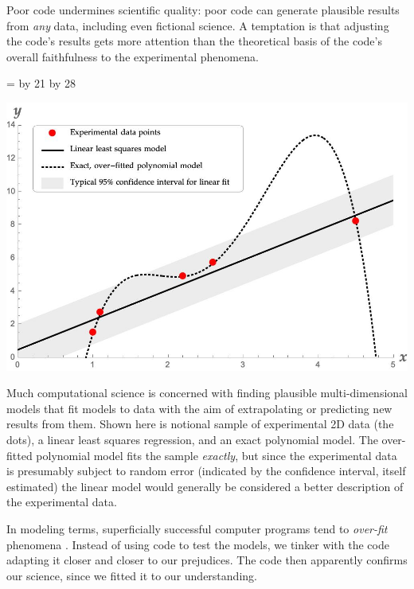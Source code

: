 \documentclass[11pt]{article}
\begin{document}
\noindent
Poor code undermines scientific quality: poor code can generate plausible results from \emph{any\/} data, including even fictional science. A temptation is that %
adjusting the code's results gets more attention than the theoretical basis of the code's overall faithfulness to the experimental phenomena. %
\def\imageWidthCalculation{\multiply \imageWidth by 21 \divide \imageWidth by 28}
\def\figureStarDetails{*}
\def\imageWidthCalculation{\multiply \imageWidth by 21 \divide \imageWidth by 28}
\def\figureStarDetails{*}
\begin{figure\figureStarDetails}[t]
{ \newdimen \imageWidth 
  \imageWidth=\textwidth
  \imageWidthCalculation
  \begin{center}\includegraphics[width=\imageWidth]{generated/mathematicaplot.jpg}\end{center}}
\caption{Much computational science is concerned with finding plausible multi-dimensional models that fit models to data with the aim of extrapolating or predicting new results from them. Shown here is notional sample of experimental 2D data (the dots), a linear least squares regression, and an exact polynomial model. The over-fitted polynomial model fits the sample \emph{exactly\/}, but since the experimental data is presumably subject to random error (indicated by the confidence interval, itself estimated) the linear model would generally be considered a better description of the experimental data.}
\label{fig-overfit}
\end{figure\figureStarDetails}
In modeling terms, superficially successful computer programs tend to \emph{over-fit\/} phenomena \cite{over-fit}. Instead of using code to test the models, we tinker with the code adapting it closer and closer to our prejudices. The code then apparently confirms our science, since we fitted it to our understanding.  
\end{document}
